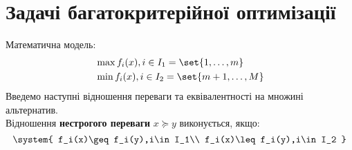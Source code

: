 \section{Задачі багатокритерійної оптимізації}
Математична модель:
\begin{eqnarray}
&\max f_i(x), i\in I_1=\set{1,\ldots,m}\label{tr:1:1}\\
&\min f_i(x), i\in I_2=\set{m+1,\ldots,M}\label{tr:1:2}
\end{eqnarray}
Введемо наступні відношення переваги та еквівалентності на множині альтернатив.\\
Відношення {\bf нестрогого переваги} $x\succeq y$ виконується, якщо:
\begin{equation}\label{tr:1:3}
\system{
f_i(x)\geq f_i(y),i\in I_1\\
f_i(x)\leq f_i(y),i\in I_2
}
\end{equation}

